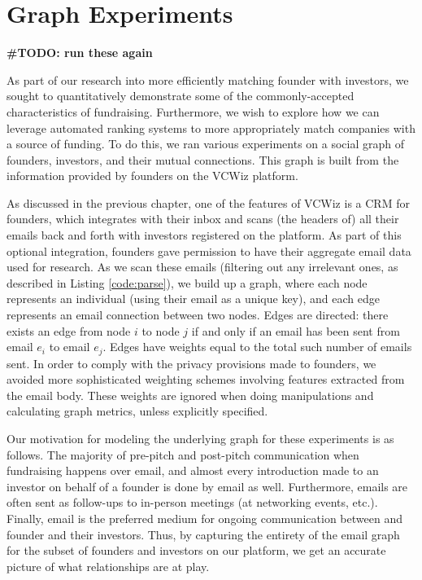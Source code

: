 \chapter{Graph Experiments}

\textbf{\#TODO: run these again}

As part of our research into more efficiently matching founder with investors, we sought to quantitatively demonstrate some of the commonly-accepted characteristics of fundraising. Furthermore, we wish to explore how we can leverage automated ranking systems to more appropriately match companies with a source of funding. To do this, we ran various experiments on a social graph of founders, investors, and their mutual connections. This graph is built from the information provided by founders on the VCWiz platform.

As discussed in the previous chapter, one of the features of VCWiz is a CRM for founders, which integrates with their inbox and scans (the headers of) all their emails back and forth with investors registered on the platform. As part of this optional integration, founders gave permission to have their aggregate email data used for research. As we scan these emails (filtering out any irrelevant ones, as described in Listing \ref{code:parse}), we build up a graph, where each node represents an individual (using their email as a unique key), and each edge represents an email connection between two nodes. Edges are directed: there exists an edge from node $i$ to node $j$ if and only if an email has been sent from email $e_i$ to email $e_j$. Edges have weights equal to the total such number of emails sent. In order to comply with the privacy provisions made to founders, we avoided more sophisticated weighting schemes involving features extracted from the email body. These weights are ignored when doing manipulations and calculating graph metrics, unless explicitly specified.

Our motivation for modeling the underlying graph for these experiments is as follows. The majority of pre-pitch and post-pitch communication when fundraising happens over email, and almost every introduction made to an investor on behalf of a founder is done by email as well. Furthermore, emails are often sent as follow-ups to in-person meetings (at networking events, etc.). Finally, email is the preferred medium for ongoing communication between and founder and their investors. Thus, by capturing the entirety of the email graph for the subset of founders and investors on our platform, we get an accurate picture of what relationships are at play.

